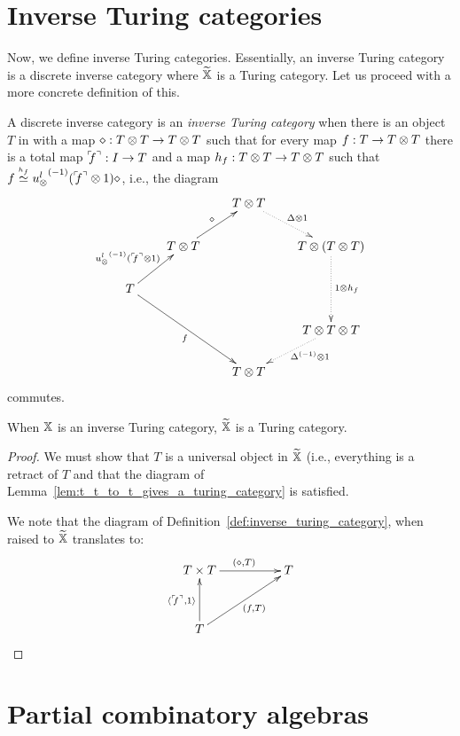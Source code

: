 \section{Inverse Turing categories}
\label{sec:inverse_turing_categories}
Now, we define inverse Turing categories. Essentially, an inverse Turing category is a discrete
inverse category \X where $\widetilde{\mathbb{X}}$ is a Turing category. Let us proceed with a more concrete
definition of this.

\begin{definition}\label{def:inverse_turing_category}
  A discrete inverse category \X is an \emph{inverse Turing category} when there is an object $T$ in
  \X with a map $\diamond :T\otimes T \to T\otimes T$ such that for every map $f:T \to T\otimes T$ there is a total map
  ${}^\ulcorner\!\!f^\urcorner: I\to T$ and a map $h_f:T\otimes T \to T\otimes T$ such that $f \overset{\scriptscriptstyle h_f}{\simeq}
  {u_{\otimes}^l}^{(-1)}({}^\ulcorner\!\!f^\urcorner\otimes1)\diamond$, i.e., the diagram
  \[
    \xymatrix @C=20pt @R=20pt{
      & & T \* T \ar@{.>}[dr]^{\Delta\* 1}\\
      &T\*T \ar[ur]^{\diamond} & & T \* (T\* T) \ar@{.>}[dd]^{1\*h_f}\\
      T \ar[ur]^{\inv{\usl}(\icode{f}\*1)} \ar[ddrr]_{f} \\
      & & & T \* T\*T \ar@{.>}[dl]^(.4){\inv{\Delta}\* 1}\\
      && T\*T
    }
  \]
  commutes.
\end{definition}

\begin{theorem}\label{thm:inverse_turing_category_gives_a_turing_category}
  When $\mathbb{X}$ is an inverse Turing category, $\widetilde{\mathbb{X}}$ is a Turing category.
\end{theorem}
\begin{proof}
  We must show that $T$ is a universal object in $\widetilde{\mathbb{X}}$ (i.e., everything is a retract of $T$ and
  that the diagram of Lemma~\ref{lem:t_t_to_t_gives_a_turing_category} is satisfied.

  We note that the diagram of Definition~\ref{def:inverse_turing_category}, when raised to $\widetilde{\mathbb{X}}$
  translates to:
  \[
    \xymatrix@C+25pt@R+10pt{
      T \times T \ar[r]^{(\diamond, T)} &T \\
      T \ar[u]^{\<\icode{f},1\>} \ar[ur]_{(f, T)}
    }
  \]

\end{proof}

\section{Partial combinatory algebras}
\label{sec:partial_combinatory_algebras}

